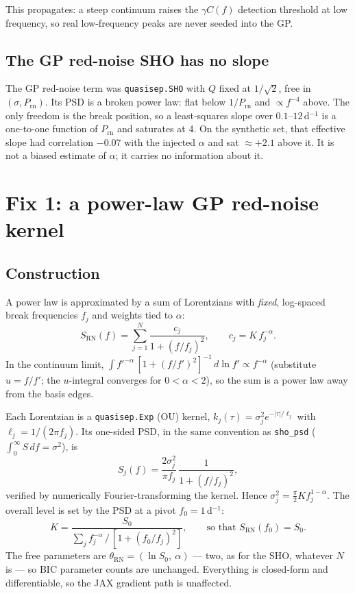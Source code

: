 \documentclass[11pt]{article}
\newcommand{\code}[1]{\texttt{#1}}
\begin{document}
This propagates: a steep continuum raises the $\gamma C(f)$ detection threshold at low
frequency, so real low-frequency peaks are never seeded into the GP.

\subsection{The GP red-noise SHO has no slope}

The GP red-noise term was \code{quasisep.SHO} with $Q$ fixed at $1/\sqrt{2}$,
free in $(\sigma, P_\mathrm{rn})$. Its PSD is a broken power law: flat below
$1/P_\mathrm{rn}$ and $\propto f^{-4}$ above. The only freedom is the break position,
so a least-squares slope over $0.1$--$12$\,d$^{-1}$ is a one-to-one function of
$P_\mathrm{rn}$ and saturates at 4. On the synthetic set, that effective slope had
correlation $-0.07$ with the injected $\alpha$ and sat $\approx +2.1$ above it. It is not
a biased estimate of $\alpha$; it carries no information about it.

\section{Fix 1: a power-law GP red-noise kernel}

\subsection{Construction}

A power law is approximated by a sum of Lorentzians with \emph{fixed}, log-spaced break
frequencies $f_j$ and weights tied to $\alpha$:
\begin{equation}
S_\mathrm{RN}(f) = \sum_{j=1}^{N} \frac{c_j}{1 + (f/f_j)^2},
\qquad c_j = K\, f_j^{-\alpha}.
\end{equation}
In the continuum limit, $\int f'^{-\alpha}\,[1+(f/f')^2]^{-1}\,d\ln f' \propto f^{-\alpha}$
(substitute $u = f/f'$; the $u$-integral converges for $0<\alpha<2$), so the sum is a power
law away from the basis edges.

Each Lorentzian is a \code{quasisep.Exp} (OU) kernel,
$k_j(\tau) = \sigma_j^2 e^{-|\tau|/\ell_j}$ with $\ell_j = 1/(2\pi f_j)$. Its one-sided
PSD, in the same convention as \code{sho\_psd} ($\int_0^\infty S\,df = \sigma^2$), is
\begin{equation}
S_j(f) = \frac{2\sigma_j^2}{\pi f_j}\,\frac{1}{1+(f/f_j)^2},
\end{equation}
verified by numerically Fourier-transforming the kernel. Hence
$\sigma_j^2 = \tfrac{\pi}{2} K f_j^{1-\alpha}$. The overall level is set by the PSD at a
pivot $f_0 = 1$\,d$^{-1}$:
\begin{equation}
K = \frac{S_0}{\sum_j f_j^{-\alpha}\,/\,[1 + (f_0/f_j)^2]},
\qquad\text{so that } S_\mathrm{RN}(f_0) = S_0.
\end{equation}
The free parameters are $\theta_\mathrm{RN} = (\ln S_0,\ \alpha)$ --- two, as for the
SHO, whatever $N$ is --- so BIC parameter counts are unchanged. Everything is closed-form
and differentiable, so the JAX gradient path is unaffected.
\end{document}
